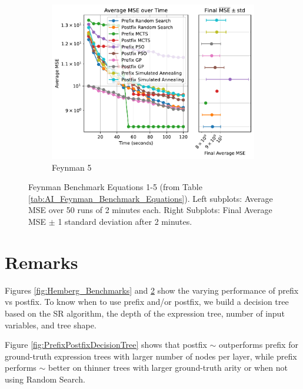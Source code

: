 \documentclass[runningheads]{llncs}
\begin{document}
\begin{figure}
    \vspace{0.5cm}
    
    \begin{subfigure}[b]{0.49\textwidth}
        \includegraphics[width=\linewidth, keepaspectratio]{AIFeynman_Benchmarks/Feynman_Benchmark_5.pdf}
        \caption{Feynman 5}
        \label{subfig:feynman_5}
    \end{subfigure}
    
    \caption{Feynman Benchmark Equations 1-5 (from Table \ref{tab:AI_Feynman_Benchmark_Equations}). Left subplots: Average MSE over 50 runs of 2 minutes each. Right Subplots: Final Average MSE $\pm$ 1 standard deviation after 2 minutes.}
    \label{fig:Feynman_Benchmarks}
\end{figure}

\section{Remarks}

Figures \ref{fig:Hemberg_Benchmarks} and \ref{fig:Feynman_Benchmarks} show the varying performance of prefix vs postfix. To know when to use prefix and/or postfix, we build a decision tree based on the SR algorithm, the depth of the expression tree, number of input variables, and tree shape.
\par Figure \ref{fig:PrefixPostfixDecisionTree} shows that postfix $\sim$  outperforms prefix for ground-truth expression trees with larger number of nodes per layer, while prefix performs $\sim$ better on thinner trees with larger ground-truth arity or when not using Random Search.
\end{document}
